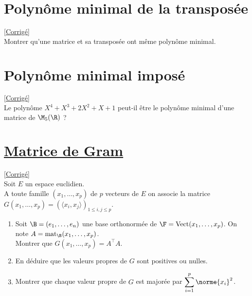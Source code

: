 \documentclass[8pt]{book}
\begin{document}
	\section{Polynôme minimal de la transposée }
	\label{Polynôme minimal de la transposée}
	\textcolor{blue}{\hyperref[Polynôme minmal de la transposée corrigé]{[Corrigé]}}\\
	Montrer qu'une matrice et sa transposée ont même polynôme minimal.
	
	\section{Polynôme minimal imposé }
	\label{Polynôme minimal imposé}
	\textcolor{blue}{\hyperref[Polynôme minimal imposé corrigé]{[Corrigé]}}\\
	Le polynôme $X^4+X^3+2X^2+X+1$ peut-il être le polynôme minimal d'une matrice de $\M_5(\R)$ ?
	
	\section{\underline{Matrice de Gram} }
	\label{Matrice de Gram}
	\textcolor{blue}{\hyperref[Matrice de Gram corrigé]{[Corrigé]}}\\
	Soit $E$ un espace euclidien.\\
	A toute famille $(x_1,\dots, x_p)$ de $p$ vecteurs de $E$ on associe la matrice $G(x_1,\dots, x_p) = (\langle x_i, x_j \rangle)_{1\leq i,j\leq p}$.
	\begin{enumerate}
		\item Soit $\B=(e_1,\dots,e_n)$ une base orthonormée de $\F=\text{Vect}(x_1,\dots,x_p)$. On note $A=\text{mat}_{\B}(x_1,\dots,x_p)$.\\
		Montrer que $G(x_1,\dots,x_p)=A^\top A$.
		\item En déduire que les valeurs propres de $G$ sont positives ou nulles.
		\item Montrer que chaque valeur propre de $G$ est majorée par $\displaystyle\sum\limits_{i=1}^p\norme{x_i}^2$.
	\end{enumerate}
	
\end{document}
